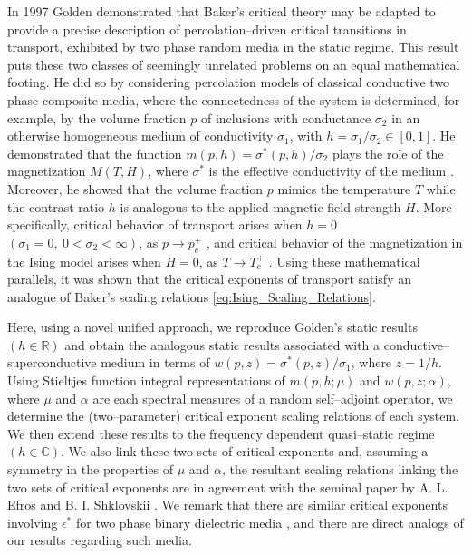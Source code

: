 \documentclass[english,12pt,jmp,graphicx]{revtex4-1}
\begin{document}
In 1997 Golden \cite{Golden:PRL-3935} demonstrated that Baker's
critical theory may be adapted to provide a precise description of
percolation--driven critical transitions in transport, exhibited by
two phase random media in the static regime. This result puts these
two classes of seemingly unrelated problems on an equal mathematical
footing. He did so by considering percolation models of classical
conductive two phase composite media, where the connectedness of the
system is determined, for example, by the volume fraction $p$ of
inclusions with conductance $\sigma_2$ in an otherwise homogeneous medium
of conductivity $\sigma_1$, with $h=\sigma_1/\sigma_2\in[0,1]$. 
He demonstrated that the function $m(p,h)=\sigma^*(p,h)/\sigma_2$ plays the role
of the magnetization  $M(T,H)$, where $\sigma^*$ is the effective
conductivity of the medium
\cite{Bergman:PRC-377,Milton:APL-300,Golden:CMP-473}. Moreover, he 
showed that the volume fraction $p$ mimics the temperature $T$ while
the contrast ratio $h$ is analogous to the applied magnetic field strength $H$. 
More specifically, critical behavior of transport
arises when $h=0$ $(\sigma_1=0, \ 0<\sigma_2<\infty)$, as $p\to p_c^+$
\cite{Golden:PRL-3935}, and 
critical behavior of the magnetization in the Ising model 
arises when $H=0$, as $T\to T_c^+$
\cite{Christensen-2005}. Using these mathematical
parallels, it was shown that the critical exponents of transport 
satisfy an analogue of Baker's %
scaling relations \eqref{eq:Ising_Scaling_Relations}.

Here, using a novel unified approach, we reproduce Golden's
static results $(h\in\mathbb{R})$ and obtain the analogous static
results associated with a conductive--superconductive medium in terms
of $w(p,z)=\sigma^*(p,z)/\sigma_1$, where $z=1/h$. Using Stieltjes function
integral representations of $m(p,h;\mu)$ and $w(p,z;\alpha)$, where $\mu$ and
$\alpha$ are each spectral measures of a random self--adjoint operator, we
determine the (two--parameter) critical exponent scaling relations of
each system. We then extend these results to the frequency dependent
quasi--static regime $(h\in\mathbb{C})$. We also link these two sets of
critical exponents and, assuming a symmetry in the properties of $\mu$
and $\alpha$, the resultant scaling relations linking the two sets of critical
exponents are in agreement with the seminal paper by A. L. Efros and
B. I. Shklovskii \cite{Efros:PSSB-303}. We remark that there are
similar critical exponents involving
$\epsilon^*$ for two phase binary dielectric media
\cite{Clerc:AP-191,Bergman:SSP-147}, and there are direct 
analogs of our results regarding such media.     
\end{document}
